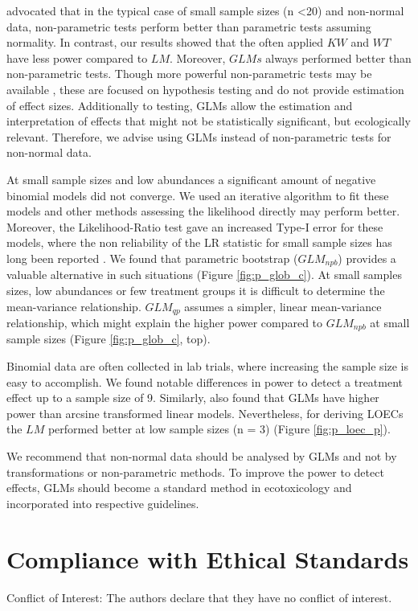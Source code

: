 \documentclass[twocolumn, natbib]{svjour3}
\begin{document}
\citet{wang_making_2011} advocated that in the typical case of small sample sizes (n \textless 20) and non-normal data, non-parametric tests perform better than parametric tests assuming normality.
In contrast, our results showed that the often applied $KW$ and $WT$ have less power compared to $LM$.
Moreover, $GLMs$ always performed better than non-parametric tests. 
Though more powerful non-parametric tests may be available \citep{konietschke_rank-based_2012}, these are focused on hypothesis testing and do not provide estimation of effect sizes.
Additionally to testing, GLMs allow the estimation and interpretation of effects that might not be statistically significant, but ecologically relevant.
Therefore, we advise using GLMs instead of non-parametric tests for non-normal data.

At small sample sizes and low abundances a significant amount of negative binomial models did not converge.
We used an iterative algorithm to fit these models \citep{venables_modern_2002} and other methods assessing the likelihood directly may perform better.
Moreover, the Likelihood-Ratio test gave an increased Type-I error for these models, where the non reliability of the LR statistic for small sample sizes has long been reported \citep{bolker_generalized_2009,wilks_large-sample_1938}. 
We found that parametric bootstrap ($GLM_{npb}$) provides a valuable alternative in such situations (Figure \ref{fig:p_glob_c}).
At small samples sizes, low abundances or few treatment groups it is difficult to determine the mean-variance relationship.
$GLM_{qp}$ assumes a simpler, linear mean-variance relationship, which might explain the higher power compared to $GLM_{npb}$ at small sample sizes (Figure \ref{fig:p_glob_c}, top).

Binomial data are often collected in lab trials, where increasing the sample size is easy to accomplish. 
We found notable differences in power to detect a treatment effect up to a sample size of 9.
Similarly, \citet{warton_arcsine_2011} also found that GLMs have higher power than arcsine transformed linear models.
Nevertheless, for deriving LOECs the $LM$ performed better at low sample sizes (n = 3) (Figure \ref{fig:p_loec_p}). 

We recommend that non-normal data should be analysed by GLMs and not by transformations or non-parametric methods.
To improve the power to detect effects, GLMs should become a standard method in ecotoxicology and incorporated into respective guidelines.


\section{Compliance with Ethical Standards}
Conflict of Interest: The authors declare that they have no conflict of interest.



\end{document}
